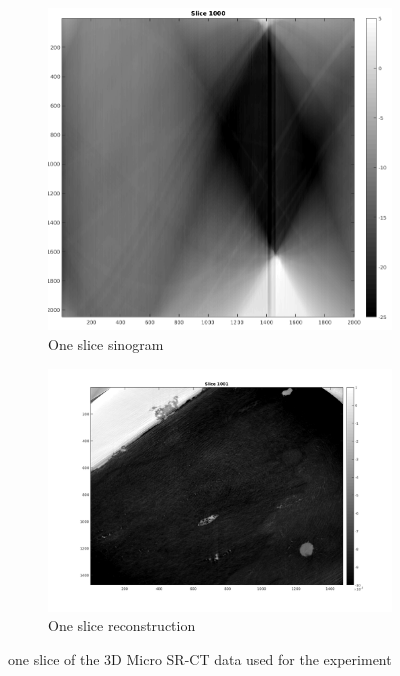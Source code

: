 \begin{figure}[ht!]
        \centering	
		\begin{subfigure}[b]{0.35\textwidth}
            \centering
            \includegraphics[width=\textwidth]{../Technical_Reports/Getting_familiarized_with_data/sinograms/Slice1000.png}
            \caption{One slice sinogram}
        \end{subfigure}
        \hfill
        \begin{subfigure}[b]{0.475\textwidth}  
            \centering 
            \includegraphics[width=\textwidth]{../Technical_Reports/Getting_familiarized_with_data/with0pad/slice1001.png}
            \caption{One slice reconstruction}
        \end{subfigure}
        \caption{one slice of the 3D Micro SR-CT data used for the experiment}
\end{figure}

